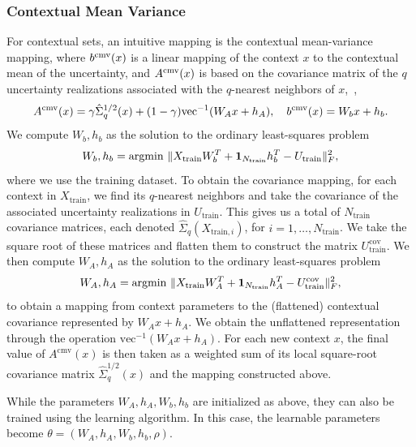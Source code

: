 \subsubsection{Contextual Mean Variance}
For contextual sets, an intuitive mapping is the contextual mean-variance mapping, where $b^{\rm cmv}(x)$ is a linear mapping of the context $x$ to the contextual mean of the uncertainty, and $A^{\rm cmv}(x)$ is based on the covariance matrix of the $q$ uncertainty realizations associated with the $q$-nearest neighbors of $x$,~\ie,
\begin{equation}
    A^{\rm cmv}(x) = \gamma\hat{\Sigma}_{q}^{1/2}(x) + (1-\gamma)\text{vec}^{-1}(W_Ax+h_A),\quad b^{\rm cmv}(x) = W_bx+h_b.
\end{equation} 
 We compute $W_b,h_b$ as the solution to the ordinary least-squares problem
$$W_b,h_b=\text{argmin}~\|X_{\text{train}}W_b^T + \mathbf 1_{N_{\text{train}}}h_b^T - U_{\text{train}}\|_F^2,$$
where we use the training dataset. 
To obtain the covariance mapping, for each context in $X_{\text{train}}$, we find its $q$-nearest neighbors and take the covariance of the associated uncertainty realizations in $U_{\text{train}}$. This gives us a total of $N_{\text{train}}$ covariance matrices, each denoted $\hat{\Sigma}_{q}(X_{\text{train},i})$, for $i = 1,\dots,N_{\text{train}}$. We take the square root of these matrices and flatten them to construct the matrix $U^{\text{cov}}_{\text{train}}$. We then compute $W_A,h_A$ as the solution to the ordinary least-squares problem
$$W_A,h_A = \text{argmin}~\|X_{\text{train}}W_A^T + \mathbf 1_{N_{\text{train}}}h_A^T - U^{\text{cov}}_{\text{train}}\|_F^2,$$
to obtain a mapping from context parameters to the (flattened) contextual covariance represented by $W_Ax+h_A$. We obtain the unflattened representation through the operation $\text{vec}^{-1}(W_Ax+h_A)$.
For each new context $x$, the final value of $A^{\text{cmv}}(x)$ is then taken as a weighted sum of its local square-root covariance matrix $\hat{\Sigma}_{q}^{1/2}(x)$ and the mapping constructed above.  

While the parameters $W_A, h_A, W_b, h_b$ are initialized as above, they can also be trained using the learning algorithm. In this case, the learnable parameters become $\theta = (W_A, h_A, W_b, h_b,\rho)$.

